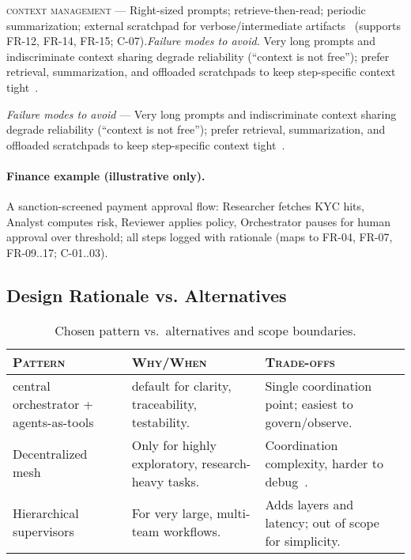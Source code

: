 \textsc{context management} --- Right-sized prompts; retrieve-then-read; periodic summarization; external scratchpad for verbose/intermediate artifacts~\parencite{breunig_context_fail,breunig_fix_context} (supports \textsc{FR-12, FR-14, FR-15; C-07}).\noindent \textit{Failure modes to avoid.} Very long prompts and indiscriminate context sharing degrade reliability (``context is not free''); prefer retrieval, summarization, and offloaded scratchpads to keep step-specific context tight~\parencite{breunig_context_fail,breunig_fix_context}.

\noindent \textit{Failure modes to avoid} --- Very long prompts and indiscriminate context sharing degrade reliability (``context is not free''); prefer retrieval, summarization, and offloaded scratchpads to keep step-specific context tight~\parencite{breunig_context_fail,breunig_fix_context}.

\paragraph{Finance example (illustrative only).}
A sanction-screened payment approval flow: Researcher fetches KYC hits, Analyst computes risk, Reviewer applies policy, Orchestrator pauses for human approval over threshold; all steps logged with rationale (maps to FR-04, FR-07, FR-09..17; C-01..03).

\subsection{Design Rationale vs. Alternatives}\label{sec:tradeoffs}
\begin{table}[h!]
  \centering
  \small
  \begin{tabular}{p{3.2cm} p{6.3cm} p{5.3cm}}
    \toprule
    \textsc{Pattern} & \textsc{Why/When} & \textsc{Trade-offs} \\
    \midrule
    central orchestrator + agents-as-tools~\cite{langchain_multi_agents} & default for clarity, traceability, testability. & Single coordination point; easiest to govern/observe. \\
    Decentralized mesh & Only for highly exploratory, research-heavy tasks. & Coordination complexity, harder to debug~\parencite{cognition_dont_build}. \\
    Hierarchical supervisors & For very large, multi-team workflows. & Adds layers and latency; out of scope for simplicity. \\
    \bottomrule
  \end{tabular}
  \caption{Chosen pattern vs.~alternatives and scope boundaries.}
\end{table}

